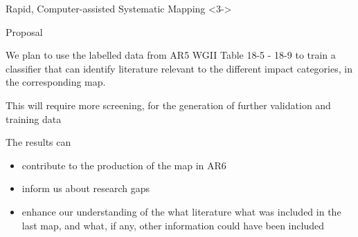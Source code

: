 \documentclass[9pt]{beamer}
\begin{document}
\begin{frame}{Rapid, Computer-assisted Systematic Mapping}
<3->


\end{frame}

\begin{frame}{Proposal}

We plan to use the labelled data from AR5 WGII Table 18-5 - 18-9 to train a classifier that can identify literature relevant to the different impact categories, in the corresponding map.

\bigskip

This will require more screening, for the generation of further validation and training data

\bigskip

The results can 

\begin{itemize}
	\item contribute to the production of the map in AR6
	\item inform us about research gaps
	\item enhance our understanding of the what literature what was included in the last map, and what, if any, other information could have been included
\end{itemize}



\end{frame}
\end{document}

